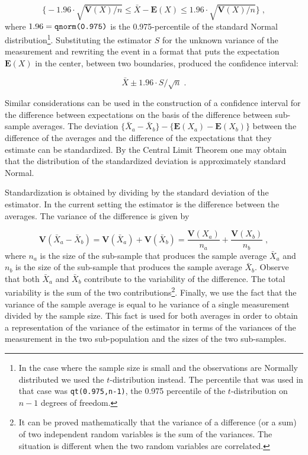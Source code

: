 \documentclass[
]{krantz}
\newcommand{\Expec}{\mathbf{E}}
\newcommand{\Var}{\mathbf{V}}
\theoremstyle{definition}
\theoremstyle{definition}
\theoremstyle{definition}
\theoremstyle{remark}
\begin{document}
\[\big\{-1.96 \cdot \sqrt{\Var(X)/n} \leq \bar X - \Expec(X) \leq 1.96 \cdot \sqrt{\Var(X)/n}\big\}\;,\]
where \(1.96 = \mbox{\texttt{qnorm(0.975)}}\) is the 0.975-percentile of
the standard Normal distribution\footnote{In the case where the sample size is small and the observations
  are Normally distributed we used the \(t\)-distribution instead. The
  percentile that was used in that case was \texttt{qt(0.975,n-1)}, the 0.975
  percentile of the \(t\)-distribution on \(n-1\) degrees of freedom.}. Substituting the estimator \(S\) for
the unknown variance of the measurement and rewriting the event in a
format that puts the expectation \(\Expec(X)\) in the center, between two
boundaries, produced the confidence interval:

\[\bar X \pm 1.96 \cdot S/\sqrt{n}\;.\]

Similar considerations can be used in the construction of a confidence
interval for the difference between expectations on the basis of the
difference between sub-sample averages. The deviation
\(\{\bar X_a- \bar X_b\} - \{\Expec(X_a)- \Expec(X_b)\}\) between the
difference of the averages and the difference of the expectations that
they estimate can be standardized. By the Central Limit Theorem one may
obtain that the distribution of the standardized deviation is
approximately standard Normal.

Standardization is obtained by dividing by the standard deviation of the
estimator. In the current setting the estimator is the difference
between the averages. The variance of the difference is given by

\[\Var(\bar X_a- \bar X_b) = \Var(\bar X_a) + \Var(\bar X_b) = \frac{\Var(X_a)}{n_a} + \frac{\Var(X_b)}{n_b}\;,\]
where \(n_a\) is the size of the sub-sample that produces the sample
average \(\bar X_a\) and \(n_b\) is the size of the sub-sample that produces
the sample average \(\bar X_b\). Observe that both \(\bar X_a\) and
\(\bar X_b\) contribute to the variability of the difference. The total
variability is the sum of the two contributions\footnote{It can be proved mathematically that the variance of a difference
  (or a sum) of two independent random variables is the sum of the
  variances. The situation is different when the two random variables
  are correlated.}. Finally, we use the
fact that the variance of the sample average is equal to he variance of
a single measurement divided by the sample size. This fact is used for
both averages in order to obtain a representation of the variance of the
estimator in terms of the variances of the measurement in the two
sub-population and the sizes of the two sub-samples.
\end{document}
